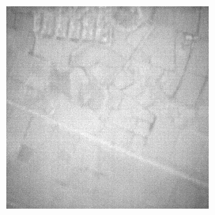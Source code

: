 \documentclass[10pt,twocolumn,letterpaper]{article}
\begin{document}
\begin{figure}[!ht]
\begin{subfigure}[b]{0.19\textwidth}
  \end{subfigure}
  \hfill
  \begin{subfigure}[b]{0.19\textwidth}
      \centering
      \includegraphics[width=\textwidth]{../figs/outputs/mono/397.png}
  \end{subfigure}    
  

\end{figure}
\end{document}
